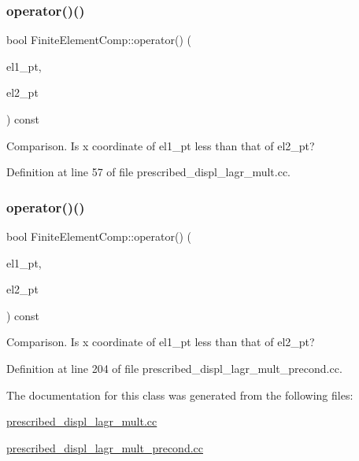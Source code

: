 \subsubsection{\texorpdfstring{operator()()}{operator()()}\hspace{0.1cm}{\footnotesize\ttfamily [1/2]}}
{\footnotesize\ttfamily bool Finite\+Element\+Comp\+::operator() (\begin{DoxyParamCaption}\item[{Finite\+Element $\ast$const \&}]{el1\+\_\+pt,  }\item[{Finite\+Element $\ast$const \&}]{el2\+\_\+pt }\end{DoxyParamCaption}) const\hspace{0.3cm}{\ttfamily [inline]}}



Comparison. Is x coordinate of el1\+\_\+pt less than that of el2\+\_\+pt? 



Definition at line 57 of file prescribed\+\_\+displ\+\_\+lagr\+\_\+mult.\+cc.

\mbox{\label{classFiniteElementComp_a23bc6293da4cbec67f9e43653778440f}} 
\subsubsection{\texorpdfstring{operator()()}{operator()()}\hspace{0.1cm}{\footnotesize\ttfamily [2/2]}}
{\footnotesize\ttfamily bool Finite\+Element\+Comp\+::operator() (\begin{DoxyParamCaption}\item[{Finite\+Element $\ast$const \&}]{el1\+\_\+pt,  }\item[{Finite\+Element $\ast$const \&}]{el2\+\_\+pt }\end{DoxyParamCaption}) const\hspace{0.3cm}{\ttfamily [inline]}}



Comparison. Is x coordinate of el1\+\_\+pt less than that of el2\+\_\+pt? 



Definition at line 204 of file prescribed\+\_\+displ\+\_\+lagr\+\_\+mult\+\_\+precond.\+cc.



The documentation for this class was generated from the following files\+:\begin{DoxyCompactItemize}
\item 
\hyperlink{prescribed__displ__lagr__mult_8cc}{prescribed\+\_\+displ\+\_\+lagr\+\_\+mult.\+cc}\item 
\hyperlink{prescribed__displ__lagr__mult__precond_8cc}{prescribed\+\_\+displ\+\_\+lagr\+\_\+mult\+\_\+precond.\+cc}\end{DoxyCompactItemize}
